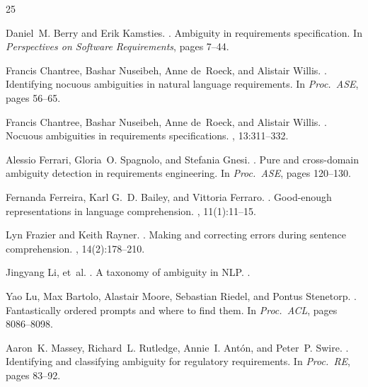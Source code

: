 \documentclass[11pt]{article}
\begin{document}
\begin{thebibliography}{25}

Daniel~M. Berry and Erik Kamsties.
.
\newblock Ambiguity in requirements specification.
\newblock In {\em Perspectives on Software Requirements}, pages 7--44.

Francis Chantree, Bashar Nuseibeh, Anne de~Roeck, and Alistair Willis.
.
\newblock Identifying nocuous ambiguities in natural language requirements.
\newblock In {\em Proc.\ ASE}, pages 56--65.

Francis Chantree, Bashar Nuseibeh, Anne de~Roeck, and Alistair Willis.
.
\newblock Nocuous ambiguities in requirements specifications.
, 13:311--332.

Alessio Ferrari, Gloria~O. Spagnolo, and Stefania Gnesi.
.
\newblock Pure and cross-domain ambiguity detection in requirements engineering.
\newblock In {\em Proc.\ ASE}, pages 120--130.

Fernanda Ferreira, Karl G.~D. Bailey, and Vittoria Ferraro.
.
\newblock Good-enough representations in language comprehension.
, 11(1):11--15.

Lyn Frazier and Keith Rayner.
.
\newblock Making and correcting errors during sentence comprehension.
, 14(2):178--210.

Jingyang Li, et~al.
.
\newblock A taxonomy of ambiguity in NLP.
.

Yao Lu, Max Bartolo, Alastair Moore, Sebastian Riedel, and Pontus Stenetorp.
.
\newblock Fantastically ordered prompts and where to find them.
\newblock In {\em Proc.\ ACL}, pages 8086--8098.

Aaron~K. Massey, Richard~L. Rutledge, Annie~I. Ant\'on, and Peter~P. Swire.
.
\newblock Identifying and classifying ambiguity for regulatory requirements.
\newblock In {\em Proc.\ RE}, pages 83--92.


\end{thebibliography}
\end{document}
